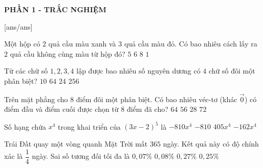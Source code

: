 
\begin{center}
	\textbf{PHẦN 1 - TRẮC NGHIỆM}
\end{center}
[ans/ans]
\begin{ex}%
Một hộp có $2$ quả cầu màu xanh và $3$ quả cầu màu đỏ. Có bao nhiêu cách lấy ra $2$ quả cầu không cùng màu từ hộp đó?
	\choice
	{$5$}
	{\True $6$}
	{$8$}
	{$1$}
\end{ex}
\begin{ex}%
	Từ các chữ số $1, 2, 3, 4$ lập được bao nhiêu số nguyên dương có $4$ chữ số đôi một phân biệt?
	\choice
	{$10$}
	{$64$}
	{\True $24$}
	{$256$}
\end{ex}
\begin{ex}%
	Trên mặt phẳng cho 8 điểm đôi một phân biệt. Có bao nhiêu véc-tơ (khác $\overrightarrow{0}$) có điểm đầu và điểm cuối được chọn từ $8$ điểm đã cho?
	\choice
	{$64$}
	{\True $56$}
	{$28$}
	{$72$}
\end{ex}
\begin{ex}%
	Số hạng chứa $x^4$ trong khai triển của $\left(3x-2\right)^5$ là
	\choice
	{\True $-810 x^4$}
	{$-810$}
	{$405 x^4$}
	{$-162 x^4$}
\end{ex}
\begin{ex}%
	Trái Đất quay một vòng quanh Mặt Trời mất $365$ ngày. Kết quả này có độ chính xác là $\dfrac{1}{4}$ ngày. Sai số tương đối tối đa là
	\choice
	{\True $0{,}07 \%$}
	{$0{,}08 \%$}
	{$0{,}27 \%$}
	{$0{,}25 \%$}
\end{ex}
